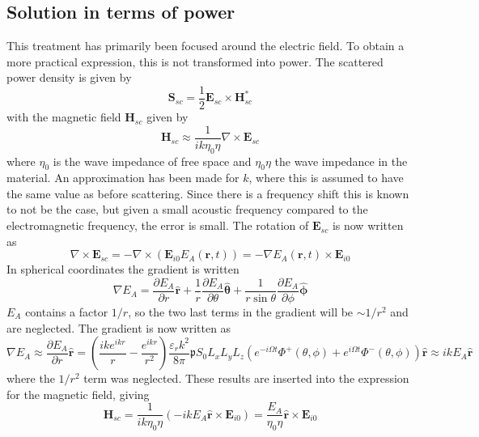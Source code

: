 \documentclass[10pt,a4paper]{eitExjobb}
\begin{document}
	\subsection{Solution in terms of power}
	This treatment has primarily been focused around the electric field. To obtain a more practical expression, this is not transformed into power. The scattered power density is given by
	\begin{equation*}
	\bm{S}_{sc} = \frac{1}{2} \bm{E}_{sc} \times \bm{H}_{sc}^*
	\end{equation*}
	with the magnetic field $\bm{H}_{sc}$ given by
	\begin{equation*}
	\bm{H}_{sc} \approx \frac{1}{ik \eta_0 \eta} \nabla \times \bm{E}_{sc}
	\end{equation*}
	where $\eta_0$ is the wave impedance of free space and $\eta_0 \eta$ the wave impedance in the material. An approximation has been made for $k$, where this is assumed to have the same value as before scattering. Since there is a frequency shift this is known to not be the case, but given a small acoustic frequency compared to the electromagnetic frequency, the error is small. The rotation of $\bm{E}_{sc}$ is now written as
	\begin{equation*}
	\nabla \times \bm{E}_{sc} = -\nabla \times (\bm{E}_{i0} E_A (\bm{r},t)) = -\nabla E_A (\bm{r},t) \times \bm{E}_{i0}
	\end{equation*}
	In spherical coordinates the gradient is written
	\begin{equation*}
	\nabla E_A = \frac{\partial E_A}{\partial r} \bm{\hat{r}} + \frac{1}{r} \frac{\partial E_A}{\partial \theta} \bm{\hat{\theta}} + \frac{1}{r\sin{\theta}} \frac{\partial E_A}{\partial \phi} \bm{\hat{\phi}}
	\end{equation*}
	$E_A$ contains a factor $1/r$, so the two last terms in the gradient will be $\sim 1/r^2$ and are neglected. The gradient is now written as
	\begin{equation*}
	\nabla E_A \approx \frac{\partial E_A}{\partial r} \bm{\hat{r}} = \left( \frac{ike^{ikr}}{r} - \frac{e^{ikr}}{r^2} \right) \frac{\varepsilon_r k^2}{8\pi} \mathfrak{p} S_0 L_x L_y L_z \left( e^{- i\Omega t} \Phi^+ (\theta,\phi) + e^{ i\Omega t} \Phi^- (\theta,\phi) \right) \bm{\hat{r}} \approx ikE_A \bm{\hat{r}}
	\end{equation*}
	where the $1/r^2$ term was neglected. These results are inserted into the expression for the magnetic field, giving
	\begin{equation*}
	\bm{H}_{sc} = \frac{1}{ik \eta_0 \eta} (-ikE_A \bm{\hat{r}} \times \bm{E}_{i0}) = \frac{E_A}{ \eta_0 \eta} \bm{\hat{r}} \times \bm{E}_{i0}
	\end{equation*}
\end{document}
